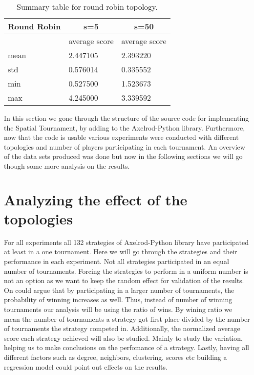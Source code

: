\begin{table}[H]
\centering
\begin{tabular}{|l|l|l|}
\hline
Round Robin & \multicolumn{1}{c|}{s=5} & \multicolumn{1}{c|}{s=50} \\ \hline
            & average score            & average score             \\ \hline
mean        & 2.447105                 & 2.393220                  \\ \hline
std         & 0.576014                 & 0.335552                  \\ \hline
min         & 0.527500                 & 1.523673                  \\ \hline
max         & 4.245000                 & 3.339592                  \\ \hline
\end{tabular}
\caption{Summary table for round robin topology.}
\label{sum-rr}
\end{table}

In this section we gone through the structure of the source code for implementing
the Spatial Tournament, by adding to the Axelrod-Python library. Furthermore, now
that the code is usable various experiments were conducted with different topologies
and number of players participating in each tournament. An overview of the
data sets produced was done but now in the following sections we will go though
some more analysis on the results.

\newpage
\section{Analyzing the effect of the topologies}
\label{sub:effects}

For all experiments all 132 strategies of Axelrod-Python library have participated
at least in a one tournament. Here we will go through the strategies and their
performance in each experiment. Not all strategies participated in an equal number
of tournaments. Forcing the strategies to perform in a uniform number is not an
option as we want to keep the random effect for validation of the results.
On could argue that by participating in a larger number of tournaments, the
probability of winning increases as well. Thus, instead of number of winning
tournaments our analysis will be using the ratio of wins. By wining ratio we mean
the number of tournaments a strategy got first place divided by the number of tournaments
the strategy competed in. Additionally, the normalized average score each strategy
achieved will also be studied. Mainly to study the variation, helping us to make
conclusions on the perfomance of a strategy.
Lastly, having all different factors such as degree, neighbors, clustering, scores
etc building a regression model could point out effects on the results.

